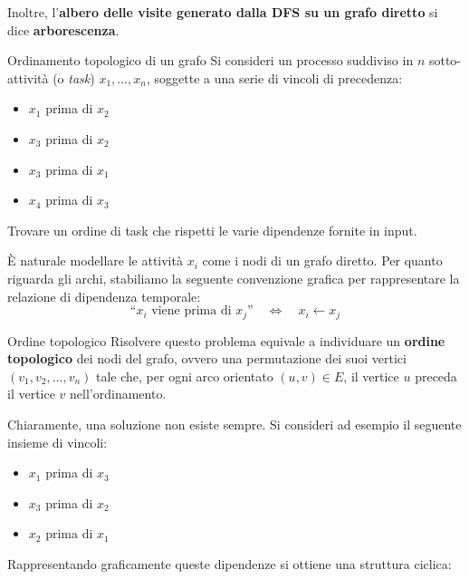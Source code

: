 \documentclass[12pt]{report}
\begin{document}
	Inoltre, l'\textbf{albero delle visite generato dalla DFS su un grafo diretto} si dice \textbf{arborescenza}.
	
	\begin{esercizio}{Ordinamento topologico di un grafo}{}
		Si consideri un processo suddiviso in $n$ sotto-attività (o \textit{task}) $x_1, \dots, x_n$, soggette a una serie di vincoli di precedenza:
		\begin{itemize}
			\item $x_1$ prima di $x_2$
			\item $x_3$ prima di $x_2$
			\item $x_3$ prima di $x_1$
			\item $x_4$ prima di $x_3$
		\end{itemize}
		Trovare un ordine di task che rispetti le varie dipendenze fornite in input.
	\end{esercizio}
	
	È naturale modellare le attività $x_i$ come i nodi di un grafo diretto. Per quanto riguarda gli archi, stabiliamo la seguente convenzione grafica per rappresentare la relazione di dipendenza temporale:
	\[
	\text{``$x_i$ viene prima di $x_j$''} \quad \iff \quad x_i \longleftarrow x_j
	\]
	
	\begin{definizione}{Ordine topologico}{}
		Risolvere questo problema equivale a individuare un \textbf{ordine topologico} dei nodi del grafo, ovvero una permutazione dei suoi vertici $(v_1, v_2, \dots, v_n)$ tale che, per ogni arco orientato $(u, v) \in E$, il vertice $u$ preceda il vertice $v$ nell'ordinamento.
	\end{definizione}
	
	Chiaramente, una soluzione non esiste sempre. Si consideri ad esempio il seguente insieme di vincoli:
	\begin{itemize}
		\item $x_1$ prima di $x_3$
		\item $x_3$ prima di $x_2$
		\item $x_2$ prima di $x_1$
	\end{itemize}
	
	Rappresentando graficamente queste dipendenze si ottiene una struttura ciclica:
	
	\begin{center}
	\end{center}
	
\end{document}
